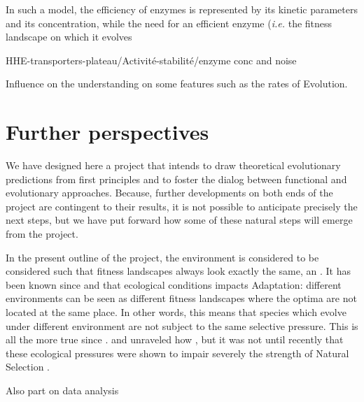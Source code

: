 \documentclass[11pt,onecolumn]{article}
\begin{document}
In such a model, the efficiency of enzymes is represented by its kinetic parameters and its concentration, while the need for an efficient enzyme (\textit{i.e.} the fitness landscape on which it evolves 

HHE-transporters-plateau/Activité-stabilité/enzyme conc and noise

Influence on the understanding on some features such as the rates of Evolution.

\section{Further perspectives}

We have designed here a project that intends to draw theoretical evolutionary predictions from first principles and to foster the dialog between functional and evolutionary approaches. Because, further developments on both ends of the project are contingent to their results, it is not possible to anticipate precisely the next steps, but we have put forward how some of these natural steps will emerge from the project.

In the present outline of the project, the environment is considered to be considered such that fitness landscapes always look exactly the same, an . It has been known since \cite{Darwin59} and \cite{Wallace58} that ecological conditions impacts Adaptation: different environments can be seen as different fitness landscapes where the optima are not located at the same place. In other words, this means that species which evolve under different environment are not subject to the same selective pressure. This is all the more true since . \citet{Wilke01b} and \citet{Mustonen08} unraveled how , but it was not until recently that these ecological pressures were shown to impair severely the strength of Natural Selection \citep{Cvijovic15}.

Also part on data analysis
\end{document}
